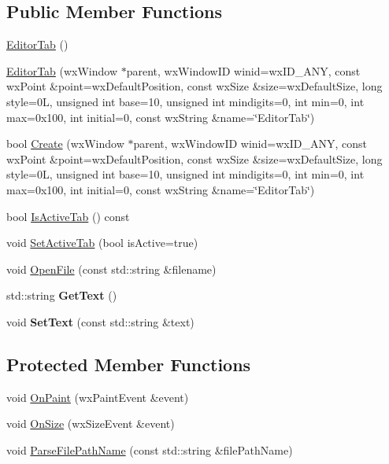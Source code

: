 \subsection*{Public Member Functions}
\begin{DoxyCompactItemize}
\item 
\hyperlink{classviews_1_1_editor_tab_a17ae375bc6f448b049aef6bbb4b61bf2}{Editor\+Tab} ()
\item 
\hyperlink{classviews_1_1_editor_tab_a63d17a88c1f547897ef4c88a983d47d3}{Editor\+Tab} (wx\+Window $\ast$parent, wx\+Window\+ID winid=wx\+I\+D\+\_\+\+A\+NY, const wx\+Point \&point=wx\+Default\+Position, const wx\+Size \&size=wx\+Default\+Size, long style=0\+L, unsigned int base=10, unsigned int mindigits=0, int min=0, int max=0x100, int initial=0, const wx\+String \&name=\char`\"{}\+Editor\+Tab\char`\"{})
\item 
bool \hyperlink{classviews_1_1_editor_tab_a068d03e26a3396fe95d881a09bb5ad2f}{Create} (wx\+Window $\ast$parent, wx\+Window\+ID winid=wx\+I\+D\+\_\+\+A\+NY, const wx\+Point \&point=wx\+Default\+Position, const wx\+Size \&size=wx\+Default\+Size, long style=0\+L, unsigned int base=10, unsigned int mindigits=0, int min=0, int max=0x100, int initial=0, const wx\+String \&name=\char`\"{}\+Editor\+Tab\char`\"{})
\item 
bool \hyperlink{classviews_1_1_editor_tab_aa19848d37030e76ebd2782166b2ba831}{Is\+Active\+Tab} () const
\item 
void \hyperlink{classviews_1_1_editor_tab_a39f3bd857e7553f8c0f36ebb99eebbfd}{Set\+Active\+Tab} (bool is\+Active=true)
\item 
void \hyperlink{classviews_1_1_editor_tab_a64a45fb74ae413acf6485294b55294d5}{Open\+File} (const std\+::string \&filename)
\item 
\mbox{\label{classviews_1_1_editor_tab_a60b1b59b565b917e34dab63ac5c1c75a}} 
std\+::string {\bfseries Get\+Text} ()
\item 
\mbox{\label{classviews_1_1_editor_tab_a5670f3df008357bf14007c34f94ddb18}} 
void {\bfseries Set\+Text} (const std\+::string \&text)
\end{DoxyCompactItemize}
\subsection*{Protected Member Functions}
\begin{DoxyCompactItemize}
\item 
void \hyperlink{classviews_1_1_editor_tab_a55d9432481adb0e67de440456d061311}{On\+Paint} (wx\+Paint\+Event \&event)
\item 
void \hyperlink{classviews_1_1_editor_tab_a5b404f2ea3e322481fe63a4b2c24154c}{On\+Size} (wx\+Size\+Event \&event)
\item 
void \hyperlink{classviews_1_1_editor_tab_ab52b9be41dc185565539d2f9cf3ce515}{Parse\+File\+Path\+Name} (const std\+::string \&file\+Path\+Name)
\end{DoxyCompactItemize}


